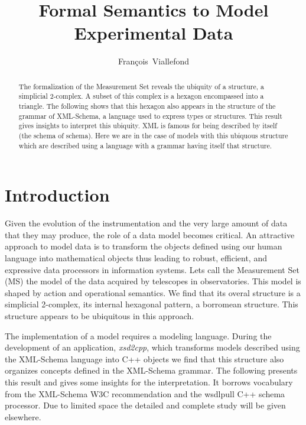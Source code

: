 
\resetcounters


\title{Formal Semantics to Model Experimental Data}
\author{Fran\c{c}ois~Viallefond
}


\begin{abstract}
The formalization of the Measurement Set reveals the ubiquity of a structure, a simplicial 2-complex. A subset of this complex is a hexagon encompassed into a triangle. The following shows that this hexagon also appears in the structure of the grammar of XML-Schema, a language used to express types or structures. This result gives insights to interpret this ubiquity. XML is famous for being described by itself (the schema of schema). Here we are in the case of models with this ubiquous structure which are described using a language with a grammar having itself that structure.
\end{abstract}

\section{Introduction}
Given the evolution of the instrumentation and the very large amount of data that they may produce, the role of a data model becomes critical. An attractive approach to model data is to transform the objects defined using our human language into mathematical objects thus leading to robust, efficient, and expressive data processors in information systems. Lets call the Measurement Set (MS) the model of the data acquired by telescopes in observatories. This model is shaped by action and operational semantics. We find that its overal structure is a simplicial 2-complex, its internal hexagonal pattern, a borromean structure. This structure appears to be ubiquitous in this approach.

The implementation of a model requires a modeling language. During the development of an application, {\it xsd2cpp}, which transforms models described using the XML-Schema language into C++ objects we find that this structure also organizes concepts defined in the XML-Schema grammar. The following presents this result and gives some insights for the interpretation. It borrows vocabulary from the XML-Schema W3C recommendation and the wsdlpull C++ schema processor. Due to limited space the detailed and complete study will be given elsewhere.

